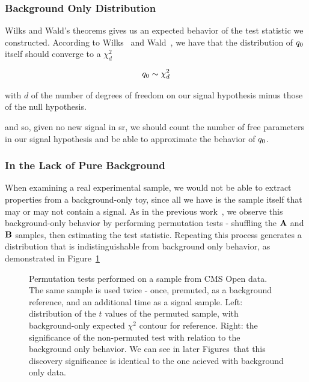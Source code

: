 \documentclass[paper/ddppaper2.tex]{subfiles}
\begin{document}
\subsubsection{Background Only Distribution}
\label{sec:Wilks_Wald}

Wilks and Wald's theorems gives us an expected behavior of the test statistic we constructed. According to Wilks~\cite{Wilks_Original} and Wald~\cite{Wald_Original}, we have that the distribution of ${q_{0}}$ itself should converge to a $\chi^2_d$

\begin{equation}
    {q_{0}} \sim \chi^2_{d}
\end{equation}

\noindent with $d$ of the number of degrees of freedom on our signal hypothesis minus those of the null hypothesis.

and so, given no new signal in \gls{sr}, we should count the number of free parameters in our signal hypothesis and be able to approximate the behavior of ${q_{0}}$.

\subsubsection{In the Lack of Pure Background}

When examining a real experimental sample, we would not be able to extract properties from a background-only toy, since all we have is the sample itself that may or may not contain a signal.
As in the previous work~\cite{LastDDPPaper}, we observe this background-only behavior by performing permutation tests - shuffling the ${\mathbf{A}}$ and ${\mathbf{B}}$ samples, then estimating the test statistic. Repeating this process generates a distribution that is indistinguishable from background only behavior, as demonstrated in Figure~\ref{fig:permutation_test}

\begin{figure}
    \centering
    \begin{minipage}{0.48\linewidth}
    \end{minipage}
    \hfill
    \begin{minipage}{0.48\linewidth}
    \end{minipage}
    \caption{Permutation tests performed on a sample from CMS Open data. The same sample is used twice - once, premuted, as a background reference, and an additional time as a signal sample. Left: distribution of the $t$ values of the permuted sample, with background-only expected $\chi^2$ contour for reference. Right: the significance of the non-permuted test with relation to the background only behavior. We can see in later Figures~that this discovery significance is identical to the one acieved with background only data.}
    \label{fig:permutation_test}
\end{figure}
\end{document}
